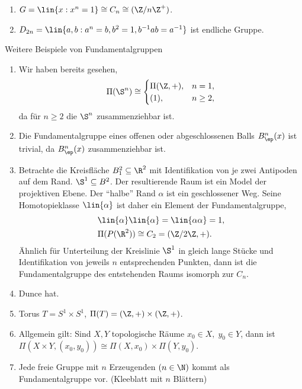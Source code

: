 \begin{bspn}
\begin{enumerate}[label=\arabic{*}.)]
  \item $G=\lin{x : x^n = 1} \cong C_n \cong (\Z/n\Z^+)$.
  \item $D_{2n} = \lin{a,b : a^n = b, b^2=1, b^{-1}ab = a^{-1}}$ ist endliche
  Gruppe.\bsphere
\end{enumerate}
\end{bspn}

\begin{bsp}
Weitere Beispiele von Fundamentalgruppen
\begin{enumerate}[label=\arabic{*}.)]
  \item Wir haben bereits gesehen,
\begin{align*}
\Pi(\S^n)\cong\begin{cases}
\Pi(\Z,+), & n=1,\\
(1),& n\ge 2,
\end{cases}
\end{align*}
da für $n\ge 2$ die $\S^n$ zusammenziehbar ist.
\item Die Fundamentalgruppe eines offenen oder abgeschlossenen Balls
$B_\ep^n(x)$ ist trivial, da $B_\ep^n(x)$ zusammenziehbar ist.
\item Betrachte die Kreisfläche $B_1^2\subseteq\R^2$ mit Identifikation von je
zwei Antipoden auf dem Rand. $\S^1\subseteq B^2$. Der resultierende Raum ist
ein Model der projektiven Ebene. Der ``halbe'' Rand $\alpha$ ist ein
geschlossener Weg. Seine Homotopieklasse $\lin{\alpha}$ ist daher ein Element
der Fundamentalgruppe,
\begin{align*}
&\lin{\alpha}\lin{\alpha} = \lin{\alpha\alpha} = 1,\\
&\Pi(P(\R^2)) \cong C_2 = (\Z/2\Z,+).
\end{align*}
Ähnlich für Unterteilung der Kreislinie $\S^1$ in gleich lange Stücke und
Identifikation von jeweils $n$ entsprechenden Punkten, dann ist die
Fundamentalgruppe des entstehenden Raums isomorph zur $C_n$.
\item Dunce hat.
\item Torus $T=S^1\times S^1$, $\Pi(T) = (\Z,+)\times(\Z,+)$.
\item Allgemein gilt: Sind $X,Y$ topologische Räume $x_0\in X,\;y_0\in Y$, dann
ist $\Pi(X\times Y,(x_0,y_0)) \cong \Pi(X,x_0)\times \Pi(Y,y_0)$.
\item Jede freie Gruppe mit  $n$ Erzeugenden $(n\in\N)$ kommt als
Fundamentalgruppe vor. (Kleeblatt mit $n$ Blättern)\bsphere
\end{enumerate}
\end{bsp}

